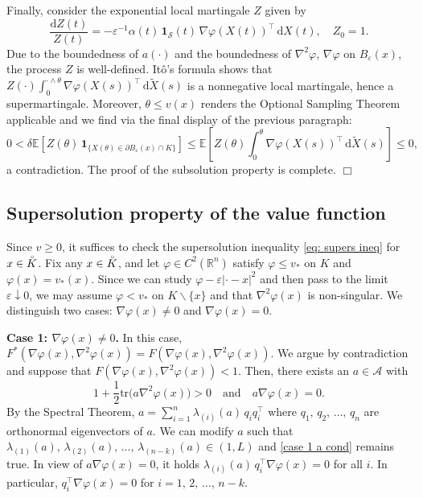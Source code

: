 \documentclass[11pt]{amsart}
\numberwithin{equation}{section}
\newcommand{\ep}{\hfill $\Box$}
\begin{document}
\smallskip
    
Finally, consider the exponential local martingale $Z$ given by
\begin{equation}
\frac{\mathrm{d}Z(t)}{Z(t)} =-\varepsilon^{-1} \alpha(t)\,\mathbf{1}_{\mathcal S}(t)\, \nabla\varphi(X(t))^{\top}\,\mathrm{d}{X(t)}, \quad Z_0 = 1.
\end{equation}
Due to the boundedness of $a(\cdot)$ and the boundedness of $\nabla^2 \varphi$, $\nabla\varphi$ on $B_\varepsilon(x)$, the process $Z$ is well-defined. It\^o's formula shows that $Z(\cdot)\int_{0}^{\cdot \wedge \theta} \nabla\varphi(X(s))^{\top} \,\mathrm{d}\widetilde{X}(s)$ is a nonnegative local martingale, hence a supermartingale. Moreover, $\theta\le v(x)$ renders the Optional Sampling Theorem applicable and we find via the final display of the previous paragraph:
\begin{equation}
0 < \delta \mathbb{E}\left[Z(\theta)\,\mathbf{1}_{\{X(\theta) \in \partial B_{\varepsilon}(x)\cap K\}} \right] \leq \mathbb{E}\left[ Z(\theta) \int_{0}^{\theta} \nabla\varphi(X(s))^{\top} \,\mathrm{d}\widetilde{X}(s) \right] \leq 0, 
\end{equation}
a contradiction. The proof of the subsolution property is complete. \ep

\subsection{Supersolution property of the value function} \label{subsec super}

Since $v\ge 0$, it suffices to check the supersolution inequality \eqref{eq: supers ineq} for $x\in\accentset{\circ}{K}$. Fix any $x\in\accentset{\circ}{K}$, and let $\varphi\in C^2(\mathbb{R}^n)$ satisfy $\varphi \le v_*$ on $K$ and $\varphi(x)=v_*(x)$. Since we can study $\varphi-\varepsilon|\cdot-x|^2$ and then pass to the limit $\varepsilon\downarrow0$, we may assume  $\varphi<v_*$ on $K\backslash\{x\}$ and that $\nabla^2 \varphi(x)$ is non-singular. We distinguish two cases: $\nabla\varphi(x)\neq0$ and $\nabla\varphi(x)=0$.

\medskip

\noindent\textbf{Case 1: $\nabla\varphi(x)\neq 0$.} In this case, $F^*(\nabla\varphi(x),\nabla^2\varphi(x))=F(\nabla\varphi(x),\nabla^2\varphi(x))$. We argue by contradiction and suppose that $F(\nabla \varphi(x),\nabla^2\varphi(x))<1$. Then, there exists an $a\in{\mathcal A}$ with 
\begin{equation}\label{case 1 a cond}
1+\frac{1}{2}\text{tr}\big(a\nabla^2\varphi(x)\big)>0\quad\text{and}\quad a\nabla\varphi(x) = 0.
\end{equation}
By the Spectral Theorem, $a=\sum_{i=1}^n \lambda_{(i)}(a)\,q_i q_i^\top$ where 
$q_1,\,q_2,\,\ldots,\,q_n$ are orthonormal eigenvectors of $a$. We can modify $a$ such that $\lambda_{(1)}(a),\,\lambda_{(2)}(a),\,\ldots,\,\lambda_{(n-k)}(a)\in(1,L)$ and \eqref{case 1 a cond} remains true. In view of $a\nabla\varphi(x)=0$, it holds $\lambda_{(i)}(a)\, q_i^{\top}\nabla\varphi(x)=0$ for all $i$. In particular, $q_i^{\top} \nabla \varphi(x) = 0$ for $i=1,\,2,\,\ldots,\, n-k$.
\end{document}
